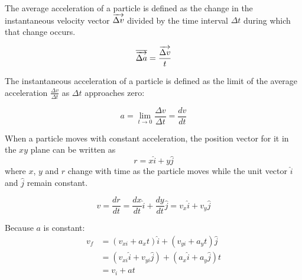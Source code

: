                 The average acceleration of a particle is defined as the change in the
                instantaneous velocity vector $\overrightarrow{\Delta v}$ divided by the time interval
                $\Delta t$ during which that change occurs.
                \begin{center}
                    \begin{equation}
                        \overline{\overrightarrow{\Delta a}} = \frac{\overrightarrow{\Delta v}}{t}
                    \end{equation}
                \end{center}

                The instantaneous acceleration of a particle is defined as the limit of the
                average acceleration $\frac{\Delta v}{\Delta t}$ as $\Delta t$ approaches
                zero:
                \begin{center}
                    \begin{equation}
                        a = \lim_{t \to 0} \frac{\Delta v}{\Delta t} = \frac{dv}{dt}
                    \end{equation}
                \end{center}
        \hiiEND
    
    \pagebreak

            \par When a particle moves with constant acceleration, the position vector for it
            in the $xy$ plane can be written as
            \begin{equation}
                r = x \hat{i} + y \hat{j}
            \end{equation}
            where $x$, $y$ and $r$ change with time as the particle moves while the unit
            vector $\hat{i}$ and $\hat{j}$ remain constant.

            \begin{equation}
                v = \frac{dr}{dt} = \frac{dx}{dt} \hat{i} + \frac{dy}{dt} \hat{j}
                = v_{x} \hat{i} + v_{y} \hat{j}
            \end{equation}
            \par Because $a$ is constant:
            \begin{equation}
                \begin{aligned}
                    v_{f} &= (v_{xi} + a_{x}t) \hat{i} + (v_{yi} + a_{y}t) \hat{j} \\
                    &= (v_{xi} \hat{i} + v_{yi} \hat{j}) + (a_{x} \hat{i} + a_{y} \hat{j})t \\
                    &= v_{i} + at
                \end{aligned}
            \end{equation}


